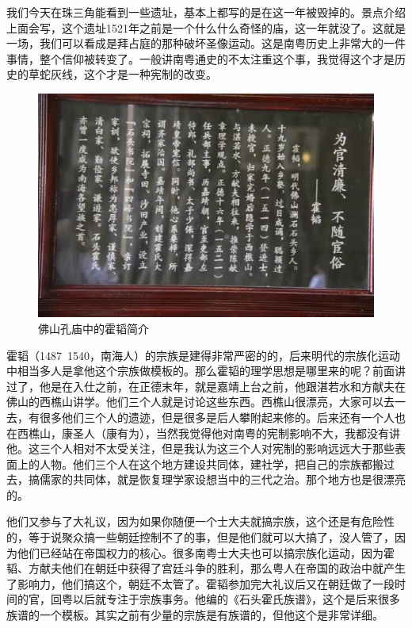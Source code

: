 我们今天在珠三角能看到一些遗址，基本上都写的是在这一年被毁掉的。景点介绍上面会写，这个遗址1521年之前是一个什么什么奇怪的庙，这一年就没了。这就是一场，我们可以看成是拜占庭的那种破坏圣像运动。这是南粤历史上非常大的一件事情，整个信仰被转变了。一般讲南粤通史的不太注重这个事，我觉得这个才是历史的草蛇灰线，这个才是一种宪制的改变。

\begin{figure}
	\centering
	\includegraphics[width=\textwidth]{images/image-56}
	\caption{佛山孔庙中的霍韬简介}
\end{figure}

霍韬（1487~1540，南海人）的宗族是建得非常严密的的，后来明代的宗族化运动中相当多人是拿他这个宗族做模板的。那么霍韬的理学思想是哪里来的呢？前面讲过了，他是在入仕之前，在正德末年，就是嘉靖上台之前，他跟湛若水和方献夫在佛山的西樵山讲学。他们三个人就是讨论这些东西。西樵山很漂亮，大家可以去一去，有很多他们三个人的遗迹，但是很多是后人攀附起来修的。后来还有一个人也在西樵山，康圣人（康有为），当然我觉得他对南粤的宪制影响不大，我都没有讲他。这三个人相对不太受关注，但是我认为这三个人对宪制的影响远远大于那些表面上的人物。他们三个人在这个地方建设共同体，建社学，把自己的宗族都搬过去，搞儒家的共同体，就是恢复理学家设想当中的三代之治。那个地方也是很漂亮的。

他们又参与了大礼议，因为如果你随便一个士大夫就搞宗族，这个还是有危险性的，等于说聚众搞一些朝廷控制不了的事，但是他们就可以大搞了，没人管了，因为他们已经站在帝国权力的核心。很多南粤士大夫也可以搞宗族化运动，因为霍韬、方献夫他们在朝廷中获得了宫廷斗争的胜利，那么粤人在帝国的政治中就产生了影响力，他们搞这个，朝廷不太管了。霍韬参加完大礼议后又在朝廷做了一段时间的官，回粤以后就专注于宗族事务。他编的《石头霍氏族谱》，这个是后来很多族谱的一个模板。其实之前有少量的宗族是有族谱的，但他这个是非常详细。

